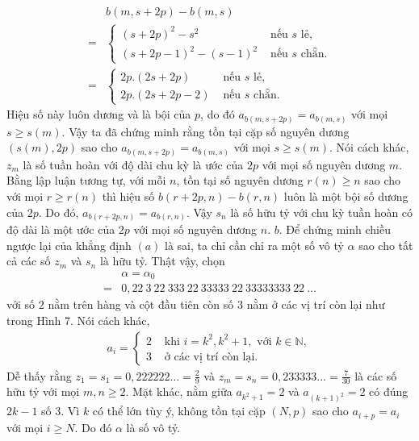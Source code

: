 \begin{multicols}{2}
		\begin{align*}
			&b(m,s + 2p) - b(m,s) \\
			=& 
			\begin{cases}
				(s + 2p)^2 - s^2 & \text{ nếu } s \text{ lẻ,} \\
				(s +2p -1)^2 - (s-1)^2 & \text{ nếu } s \text{ chẵn}.
			\end{cases} \\
			=&
			\begin{cases}
				2p.(2s + 2p)& \text{ nếu } s \text{ lẻ,} \\
				2p.(2s+2p-2) & \text{ nếu } s \text{ chẵn.}
			\end{cases}
		\end{align*}
		Hiệu số này luôn dương và là bội của $p$, do đó $a_{b(m,s + 2p)} = a_{b(m,s)}$ với mọi $s \ge s(m)$. Vậy ta đã chứng minh rằng tồn tại cặp số nguyên dương $(s(m), 2p)$ sao cho $a_{b(m,s + 2p)} = a_{b(m,s)}$ với mọi $s \ge s(m)$. Nói cách khác, $z_m$ là số tuần hoàn với độ dài chu kỳ là ước của $2p$ với mọi số nguyên dương $m$. 
		\vskip 0.1cm
		Bằng lập luận tương tự, với mỗi $n$, tồn tại số nguyên dương $r(n) \ge n$ sao cho với mọi $r \ge r(n)$ thì hiệu số $b(r + 2p,n) - b(r, n)$ luôn là một bội số dương của $2p$. Do đó, $a_{b(r + 2p,n)} = a_{b(r,n)}$. Vậy $s_n$ là số hữu tỷ với chu kỳ tuần hoàn có độ dài là một ước của $2p$ với mọi số nguyên dương $n$.
		\vskip 0.1cm
		$b.$ Để chứng minh chiều ngược lại của khẳng định $(a)$ là sai, ta chỉ cần chỉ ra một số vô tỷ $\alpha$ sao cho tất cả các số $z_m$ và $s_n$ là hữu tỷ. Thật vậy, chọn 
		\begin{align*}
			&\alpha = \alpha_0 \\
			= &0,22 \ 3 \ 22 \ 333 \ 22 \ 33333 \ 22 \ 33333333 \ 22 \ \ldots
		\end{align*}
		với số $2$ nằm trên hàng và cột đầu tiên còn số $3$ nằm ở các vị trí còn lại như trong Hình $7$. Nói cách khác,
		\begin{align*}
			a_i = 
			\begin{cases}
				2 & \text{ khi }  i = k^2, k^2 + 1, \text{ với } k \in \mathbb{N}, \\
				3 & \text{ ở các vị trí còn lại}.
			\end{cases}
		\end{align*}
		Dễ thấy rằng $z_1 = s_1 = 0,222222 \ldots = \frac{2}{9}$ và $z_m = s_n = 0,233333 \ldots = \frac{7}{30}$ là các số hữu tỷ với mọi $m, n \ge 2$. Mặt khác, nằm giữa $a_{k^2 + 1} = 2$ và $a_{(k+1)^2} = 2$ có đúng $2k-1$ số $3$. Vì $k$ có thể lớn tùy ý, không tồn tại cặp $(N,p)$ sao cho $a_{i + p} = a_i$ với mọi $i \ge N$. Do đó $\alpha$ là số vô tỷ.

\end{multicols}
